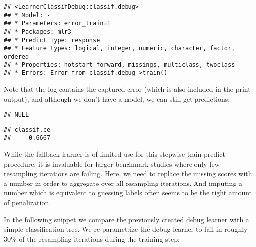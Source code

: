 \documentclass[
]{scrbook}
\newenvironment{Shaded}{\begin{snugshade}}{\end{snugshade}}
\newcommand{\FunctionTok}[1]{\textcolor[rgb]{0.00,0.00,0.00}{#1}}
\newcommand{\NormalTok}[1]{#1}
\newcommand{\OtherTok}[1]{\textcolor[rgb]{0.56,0.35,0.01}{#1}}
\newcommand{\SpecialCharTok}[1]{\textcolor[rgb]{0.00,0.00,0.00}{#1}}
\renewenvironment{Shaded} {\begin{snugshade}\small} {\end{snugshade}}
\begin{document}
\begin{verbatim}
## <LearnerClassifDebug:classif.debug>
## * Model: -
## * Parameters: error_train=1
## * Packages: mlr3
## * Predict Type: response
## * Feature types: logical, integer, numeric, character, factor, ordered
## * Properties: hotstart_forward, missings, multiclass, twoclass
## * Errors: Error from classif.debug->train()
\end{verbatim}

Note that the log contains the captured error (which is also included in the print output), and although we don't have a model, we can still get predictions:

\begin{Shaded}
\end{Shaded}

\begin{verbatim}
## NULL
\end{verbatim}

\begin{Shaded}
\end{Shaded}

\begin{verbatim}
## classif.ce 
##     0.6667
\end{verbatim}

While the fallback learner is of limited use for this stepwise train-predict procedure, it is invaluable for larger benchmark studies where only few resampling iterations are failing.
Here, we need to replace the missing scores with a number in order to aggregate over all resampling iterations.
And imputing a number which is equivalent to guessing labels often seems to be the right amount of penalization.

In the following snippet we compare the previously created debug learner with a simple classification tree.
We re-parametrize the debug learner to fail in roughly 30\% of the resampling iterations during the training step:
\end{document}
